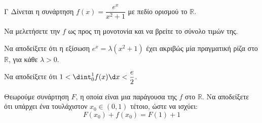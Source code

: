 \begin{thema}{Γ}
Δίνεται η συνάρτηση $f(x) = \dfrac{e^x}{x^2+1}$ με πεδίο ορισμού το $\mathbb{R}$.
\begin{erwthma}
  \item Να μελετήσετε την $f$ ως προς τη μονοτονία και να βρείτε το σύνολο τιμών της.
  \item Να αποδείξετε ότι η εξίσωση $e^x = \lambda(x^2+1)$ έχει ακριβώς μία πραγματική ρίζα στο $\mathbb{R}$, για κάθε $\lambda > 0$.
  \item Να αποδείξετε ότι $1 < \dint_0^1 f(x) \d x < \dfrac{e}{2}$.
  \item Θεωρούμε συνάρτηση $F$, η οποία είναι μια παράγουσα της $f$ στο $\mathbb{R}$. Να αποδείξετε ότι υπάρχει ένα τουλάχιστον $x_0 \in (0, 1)$ τέτοιο, ώστε να ισχύει: $$F(x_0) + f(x_0) = F(1) + 1$$
\end{erwthma}
\end{thema}

